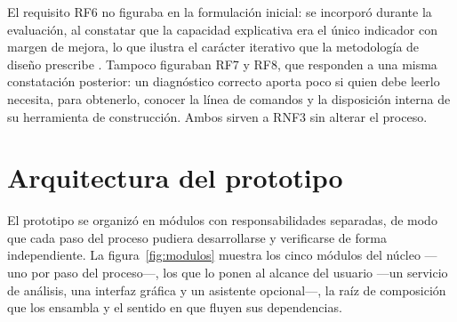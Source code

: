 El requisito RF6 no figuraba en la formulación inicial: se incorporó durante la evaluación, al constatar que la capacidad explicativa era el único indicador con margen de mejora, lo que ilustra el carácter iterativo que la metodología de diseño prescribe \citep{Peffers2007}. Tampoco figuraban RF7 y RF8, que responden a una misma constatación posterior: un diagnóstico correcto aporta poco si quien debe leerlo necesita, para obtenerlo, conocer la línea de comandos y la disposición interna de su herramienta de construcción. Ambos sirven a RNF3 sin alterar el proceso.

\section{Arquitectura del prototipo}
\label{sec:diseno}
El prototipo se organizó en módulos con responsabilidades separadas, de modo que cada paso del proceso pudiera desarrollarse y verificarse de forma independiente. La figura~\ref{fig:modulos} muestra los cinco módulos del núcleo ---uno por paso del proceso---, los que lo ponen al alcance del usuario ---un servicio de análisis, una interfaz gráfica y un asistente opcional---, la raíz de composición que los ensambla y el sentido en que fluyen sus dependencias.


